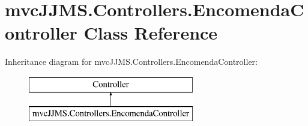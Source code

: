 \hypertarget{classmvc_j_j_m_s_1_1_controllers_1_1_encomenda_controller}{}\section{mvc\+J\+J\+M\+S.\+Controllers.\+Encomenda\+Controller Class Reference}
\label{classmvc_j_j_m_s_1_1_controllers_1_1_encomenda_controller}
Inheritance diagram for mvc\+J\+J\+M\+S.\+Controllers.\+Encomenda\+Controller\+:\begin{figure}[H]
\begin{center}
\leavevmode
\includegraphics[height=2.000000cm]{classmvc_j_j_m_s_1_1_controllers_1_1_encomenda_controller}
\end{center}
\end{figure}
